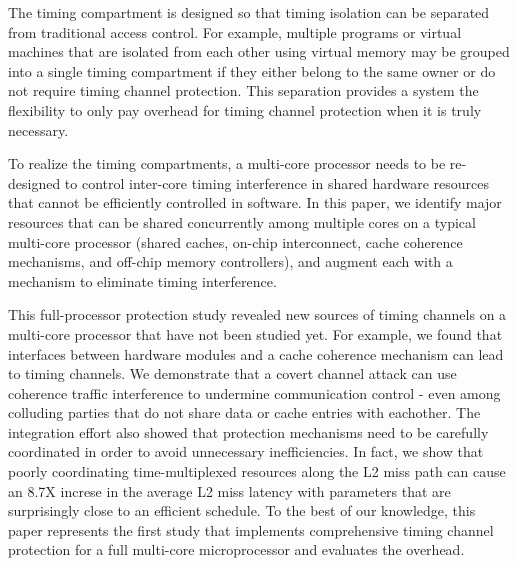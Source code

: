 The timing compartment is designed so that timing isolation can be
separated from traditional access control. For example, multiple programs or
virtual machines that are isolated from each other using virtual memory may
be grouped into a single timing compartment if they either belong to the 
same owner or do not require timing channel protection. 
This separation provides a system the flexibility to only pay overhead for
timing channel protection when it is truly necessary.

To realize the timing compartments, a multi-core processor needs to be
re-designed to control inter-core timing interference in shared hardware
resources that cannot be efficiently controlled in software.
In this paper, we identify major resources that can be shared concurrently among
multiple cores on a typical multi-core processor (shared caches,
on-chip interconnect, cache coherence mechanisms, and off-chip memory 
controllers),
and augment each with a mechanism
to eliminate timing interference.

This full-processor protection study revealed new sources of timing
channels on a multi-core processor that have not been studied yet.
For example, we found that interfaces between hardware modules and 
a cache coherence mechanism can lead to timing channels. We demonstrate
that a covert channel attack can use coherence traffic interference to 
undermine communication control - even among colluding parties that do not 
share data or cache entries with eachother.
The integration effort also showed that protection mechanisms need to
be carefully coordinated in order to avoid unnecessary inefficiencies.
In fact, we show that poorly coordinating time-multiplexed resources along the 
L2 miss path can cause an 8.7X increse in the average L2 miss latency with 
parameters that are surprisingly close to an efficient schedule.
To the best of our knowledge, this paper represents the first study
that implements comprehensive timing channel protection for a full 
multi-core microprocessor and evaluates the overhead.


